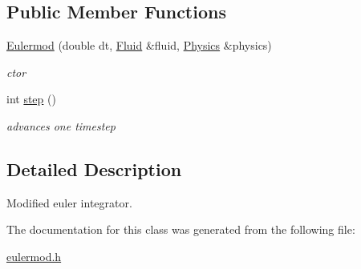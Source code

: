 \subsection*{\-Public \-Member \-Functions}
\begin{DoxyCompactItemize}
\item 
\hypertarget{classEulermod_a60dfcac405d5024f76baa9f4cf037a18}{\hyperlink{classEulermod_a60dfcac405d5024f76baa9f4cf037a18}{\-Eulermod} (double dt, \hyperlink{classFluid}{\-Fluid} \&fluid, \hyperlink{classPhysics}{\-Physics} \&physics)}\label{classEulermod_a60dfcac405d5024f76baa9f4cf037a18}

\begin{DoxyCompactList}\small\item\em ctor \end{DoxyCompactList}\item 
\hypertarget{classEulermod_aa47d39f3d649484b159ecdd4b6d88ff2}{int \hyperlink{classEulermod_aa47d39f3d649484b159ecdd4b6d88ff2}{step} ()}\label{classEulermod_aa47d39f3d649484b159ecdd4b6d88ff2}

\begin{DoxyCompactList}\small\item\em advances one timestep \end{DoxyCompactList}\end{DoxyCompactItemize}


\subsection{\-Detailed \-Description}
\-Modified euler integrator. 

\-The documentation for this class was generated from the following file\-:\begin{DoxyCompactItemize}
\item 
\hyperlink{eulermod_8h}{eulermod.\-h}\end{DoxyCompactItemize}
